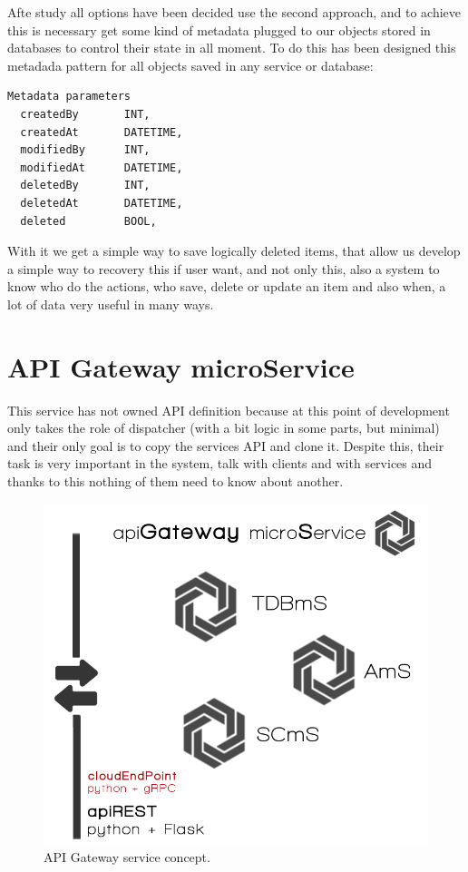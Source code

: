 \noindent Afte study all options have been decided use the second approach, and to achieve
this is necessary get some kind of metadata plugged to our objects stored in databases
to control their state in all moment.
To do this has been designed this metadada pattern for all objects saved in any
service or database:

\begin{lstlisting}[language=python,frame=none]
  Metadata parameters
  createdBy       INT,
  createdAt       DATETIME,
  modifiedBy      INT,
  modifiedAt      DATETIME,
  deletedBy       INT,
  deletedAt       DATETIME,
  deleted         BOOL,

\end{lstlisting}

With it we get a simple way to save logically deleted items, that allow us
develop a simple way to recovery this if user want, and not only this, also
a system to know who do the actions, who save, delete or update an item and
also when, a lot of data very useful in many ways.


\section{API Gateway microService}

This service has not owned API definition because at this point of development
only takes the role of dispatcher (with a bit logic in some parts, but minimal)
and their only goal is to copy the services API and clone it. Despite this, their
task is very important in the system, talk with clients and with services and thanks
to this nothing of them need to know about another.

\begin{figure}[H]
  \includegraphics[scale=0.35]{img/graphics/apigateway.png}
  \centering
  \caption{API Gateway service concept.}
\end{figure}

